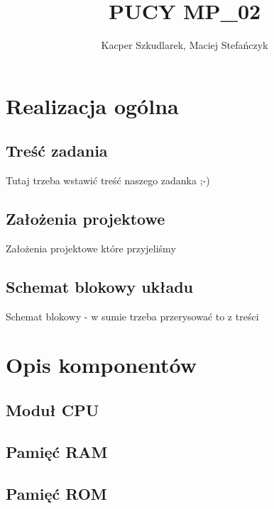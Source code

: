 \documentclass[a4paper,12pt]{report}
\author{Kacper Szkudlarek, Maciej Stefańczyk}
\title{PUCY MP\_02}
\begin{document}
\maketitle

\tableofcontents



\chapter{Realizacja ogólna}

\section{Treść zadania}

Tutaj trzeba wstawić treść naszego zadanka ;-)

\section{Założenia projektowe}

Założenia projektowe które przyjeliśmy

\section{Schemat blokowy układu}

Schemat blokowy - w sumie trzeba przerysować to z treści

\chapter{Opis komponentów}

\section{Moduł CPU}


\section{Pamięć RAM}


\section{Pamięć ROM}
\end{document}

